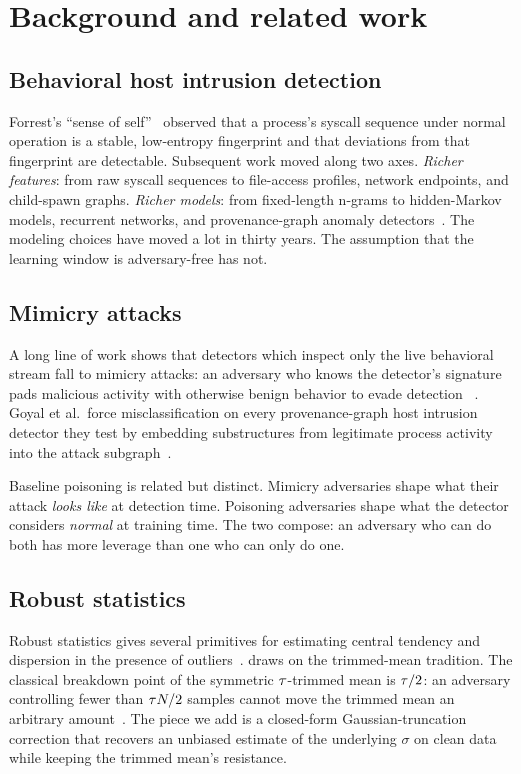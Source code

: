 \section{Background and related work}
\label{sec:background}

\subsection{Behavioral host intrusion detection}

Forrest's ``sense of self''~\cite{forrest1996sense} observed that a
process's syscall sequence under normal operation is a stable,
low-entropy fingerprint and that deviations from that fingerprint are
detectable. Subsequent work moved along two axes. \emph{Richer
features}: from raw syscall sequences to file-access profiles,
network endpoints, and child-spawn graphs. \emph{Richer models}: from
fixed-length n-grams to hidden-Markov models, recurrent networks, and
provenance-graph anomaly detectors~\cite{goyal2023mimicry}. The
modeling choices have moved a lot in thirty years. The assumption
that the learning window is adversary-free has not.

\subsection{Mimicry attacks}

A long line of work shows that detectors which inspect only the live
behavioral stream fall to mimicry attacks: an adversary who knows the
detector's signature pads malicious activity with otherwise benign
behavior to evade detection
~\cite{wagner2002mimicry,goyal2023mimicry}. Goyal et al.\ force
misclassification on every provenance-graph host intrusion detector
they test by embedding substructures from legitimate process activity
into the attack subgraph~\cite{goyal2023mimicry}.

Baseline poisoning is related but distinct. Mimicry adversaries shape
what their attack \emph{looks like} at detection time. Poisoning
adversaries shape what the detector considers \emph{normal} at
training time. The two compose: an adversary who can do both has more
leverage than one who can only do one.

\subsection{Robust statistics}

Robust statistics gives several primitives for estimating central
tendency and dispersion in the presence of
outliers~\cite{huber1964robust,rousseeuw1985mvd}. \sediment{} draws
on the trimmed-mean tradition. The classical breakdown point of the
symmetric $\tau$-trimmed mean is $\tau/2$: an adversary controlling
fewer than $\tau N / 2$ samples cannot move the trimmed mean an
arbitrary amount~\cite{huber1964robust}. The piece we add is a
closed-form Gaussian-truncation correction that recovers an unbiased
estimate of the underlying $\sigma$ on clean data while keeping the
trimmed mean's resistance.

